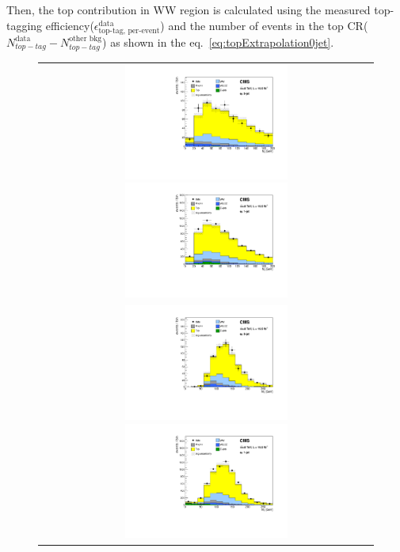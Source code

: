 Then, the top contribution in WW region is calculated using the measured
top-tagging efficiency($\epsilon_{\textrm{top-tag, per-event}}^{\textrm{data}}$) 
and the number of events in the top CR($N_{top-tag}^{\textrm{data}}
-N_{top-tag}^{\textrm{other bkg}}$) as shown in the eq.~\ref{eq:topExtrapolation0jet}.

\begin{figure}[htp] 
\centering 
\begin{tabular}{c} 
\includegraphics[width=0.5\textwidth]{figures/topcontrol_mll_of_0j.pdf}
\includegraphics[width=0.5\textwidth]{figures/topcontrol_mll_of_1j.pdf} 
\\
\includegraphics[width=0.5\textwidth]{figures/topcontrol_mt_of_0j.pdf}
\includegraphics[width=0.5\textwidth]{figures/topcontrol_mt_of_1j.pdf} 

\end{tabular}
\end{figure}
